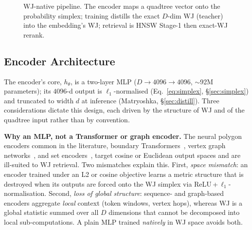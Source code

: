\documentclass[sigconf]{acmart}
\begin{document}
\begin{figure}[t]\centering
{}
\caption{WJ-native pipeline. The encoder maps a quadtree vector onto the
probability simplex; training distills the exact $D$-dim WJ (teacher) into the
embedding's WJ; retrieval is HNSW Stage-1 then exact-WJ rerank.
}
\label{fig:pipeline}
\end{figure}

\subsection{Encoder Architecture}
\label{sec:embed}
The encoder's core, $h_\theta$, is a two-layer MLP ($D\!\to\!4096\!\to\!4096$,
$\sim$92M parameters); its $4096$-d output is $\ell_1$-normalised
(Eq.~\ref{eq:simplex}, \S\ref{sec:simplex}) and truncated to width $d$ at inference
(Matryoshka, \S\ref{sec:distill}). Three considerations dictate this design, each
driven by the structure of WJ and of the quadtree input rather than by convention.

\noindent\textbf{Why an MLP, not a Transformer or graph encoder.} The neural polygon
encoders common in the literature, boundary Transformers~\cite{mai22}, vertex graph
networks~\cite{polygongnn24}, and set encoders~\cite{deepsets17}, target cosine or
Euclidean output spaces and are ill-suited to WJ retrieval. Two mismatches explain
this. First, \emph{space mismatch}: an encoder trained under an L2 or cosine
objective learns a metric structure that is destroyed when its outputs are forced
onto the WJ simplex via ReLU\,+\,$\ell_1$-normalisation. Second, \emph{loss of
global structure}: sequence- and graph-based encoders aggregate \emph{local}
context (token windows, vertex hops), whereas WJ is a global statistic summed over
all $D$ dimensions that cannot be decomposed into local sub-computations. A plain
MLP trained \emph{natively} in WJ space avoids both.
\end{document}

